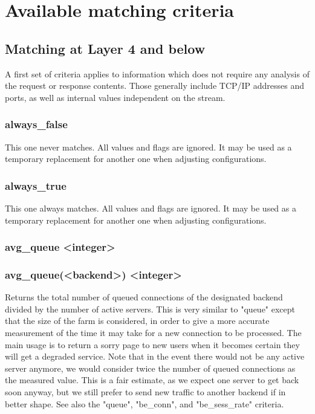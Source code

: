 \section{Available matching criteria}

\subsection{Matching at Layer 4 and below}

A first set of criteria applies to information which does not require any
analysis of the request or response contents. Those generally include TCP/IP
addresses and ports, as well as internal values independent on the stream.

\subsubsection{always\_false}
  This one never matches. All values and flags are ignored. It may be used as
  a temporary replacement for another one when adjusting configurations.

\subsubsection{always\_true}
  This one always matches. All values and flags are ignored. It may be used as
  a temporary replacement for another one when adjusting configurations.

\subsubsection[avg\_queue]{avg\_queue <integer>}
\subsubsection*{avg\_queue(<backend>) <integer>}
  Returns the total number of queued connections of the designated backend
  divided by the number of active servers. This is very similar to "queue"
  except that the size of the farm is considered, in order to give a more
  accurate measurement of the time it may take for a new connection to be
  processed. The main usage is to return a sorry page to new users when it
  becomes certain they will get a degraded service. Note that in the event
  there would not be any active server anymore, we would consider twice the
  number of queued connections as the measured value. This is a fair estimate,
  as we expect one server to get back soon anyway, but we still prefer to send
  new traffic to another backend if in better shape. See also the "queue",
  "be\_conn", and "be\_sess\_rate" criteria.

